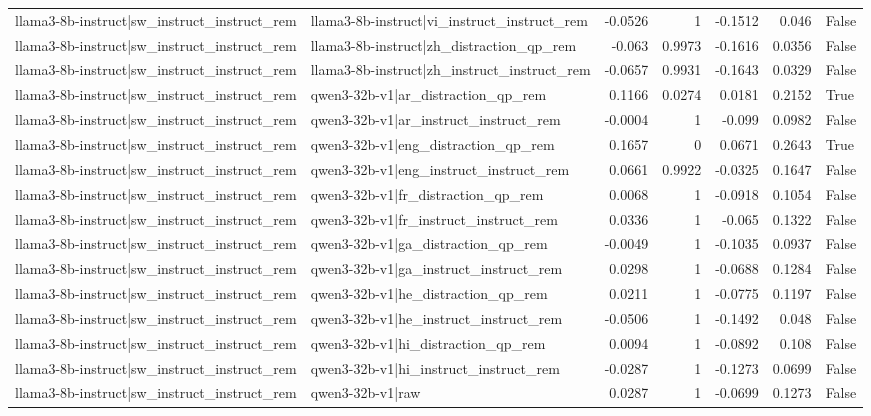 \begin{table}
\begin{tabular}{l l r r r r l}
llama3-8b-instruct|sw_instruct_instruct_rem & llama3-8b-instruct|vi_instruct_instruct_rem & -0.0526 & 1 & -0.1512 & 0.046 & False \\
llama3-8b-instruct|sw_instruct_instruct_rem & llama3-8b-instruct|zh_distraction_qp_rem & -0.063 & 0.9973 & -0.1616 & 0.0356 & False \\
llama3-8b-instruct|sw_instruct_instruct_rem & llama3-8b-instruct|zh_instruct_instruct_rem & -0.0657 & 0.9931 & -0.1643 & 0.0329 & False \\
llama3-8b-instruct|sw_instruct_instruct_rem & qwen3-32b-v1|ar_distraction_qp_rem & 0.1166 & 0.0274 & 0.0181 & 0.2152 & True \\
llama3-8b-instruct|sw_instruct_instruct_rem & qwen3-32b-v1|ar_instruct_instruct_rem & -0.0004 & 1 & -0.099 & 0.0982 & False \\
llama3-8b-instruct|sw_instruct_instruct_rem & qwen3-32b-v1|eng_distraction_qp_rem & 0.1657 & 0 & 0.0671 & 0.2643 & True \\
llama3-8b-instruct|sw_instruct_instruct_rem & qwen3-32b-v1|eng_instruct_instruct_rem & 0.0661 & 0.9922 & -0.0325 & 0.1647 & False \\
llama3-8b-instruct|sw_instruct_instruct_rem & qwen3-32b-v1|fr_distraction_qp_rem & 0.0068 & 1 & -0.0918 & 0.1054 & False \\
llama3-8b-instruct|sw_instruct_instruct_rem & qwen3-32b-v1|fr_instruct_instruct_rem & 0.0336 & 1 & -0.065 & 0.1322 & False \\
llama3-8b-instruct|sw_instruct_instruct_rem & qwen3-32b-v1|ga_distraction_qp_rem & -0.0049 & 1 & -0.1035 & 0.0937 & False \\
llama3-8b-instruct|sw_instruct_instruct_rem & qwen3-32b-v1|ga_instruct_instruct_rem & 0.0298 & 1 & -0.0688 & 0.1284 & False \\
llama3-8b-instruct|sw_instruct_instruct_rem & qwen3-32b-v1|he_distraction_qp_rem & 0.0211 & 1 & -0.0775 & 0.1197 & False \\
llama3-8b-instruct|sw_instruct_instruct_rem & qwen3-32b-v1|he_instruct_instruct_rem & -0.0506 & 1 & -0.1492 & 0.048 & False \\
llama3-8b-instruct|sw_instruct_instruct_rem & qwen3-32b-v1|hi_distraction_qp_rem & 0.0094 & 1 & -0.0892 & 0.108 & False \\
llama3-8b-instruct|sw_instruct_instruct_rem & qwen3-32b-v1|hi_instruct_instruct_rem & -0.0287 & 1 & -0.1273 & 0.0699 & False \\
llama3-8b-instruct|sw_instruct_instruct_rem & qwen3-32b-v1|raw & 0.0287 & 1 & -0.0699 & 0.1273 & False \\

\end{tabular}
\end{table}
